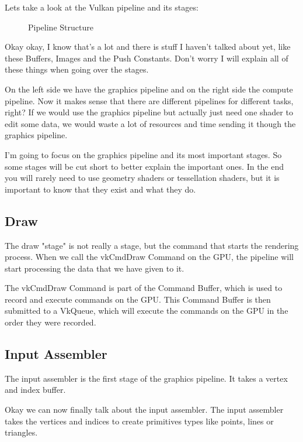 \documentclass[12pt]{report} \usepackage{preamble}
\begin{document}
Lets take a look at the Vulkan pipeline and its stages:

\begin{figure}[hbtp]
	\fontsize{6}{10}\selectfont
	\centering 
	\caption{Pipeline Structure \cite{fig:pipeline}}
\end{figure} \FloatBarrier

Okay okay, I know that's a lot and there is stuff I haven't talked about
yet, like these Buffers, Images and the Push Constants. Don't worry I
will explain all of these things when going over the stages.

On the left side we have the graphics pipeline and on the right side the
compute pipeline. Now it makes sense that there are different pipelines
for different tasks, right? If we would use the graphics pipeline but
actually just need one shader to edit some data, we would waste a lot
of resources and time sending it though the graphics pipeline.

I'm going to focus on the graphics pipeline and its most important stages.
So some stages will be cut short to better explain the important ones.
In the end you will rarely need to use geometry shaders or tessellation
shaders, but it is important to know that they exist and what they do.

\subsection{Draw}

The draw "stage" is not really a stage, but the command that starts
the rendering process. When we call the vkCmdDraw Command on the GPU,
the pipeline will start processing the data that we have given to
it. \cite{vulkan-spec-draw}

The vkCmdDraw Command is part of the Command Buffer, which is used to
record and execute commands on the GPU. This Command Buffer is then
submitted to a VkQueue, which will execute the commands on the GPU
in the order they were recorded. \cite{command-buffers}


\subsection{Input Assembler}

The input assembler is the first stage of the graphics pipeline. It takes
a vertex and index buffer. \cite{vulkan-spec-pipelines}

Okay we can now finally talk about the input assembler. The input
assembler takes the vertices and indices to create primitives types like
points, lines or triangles. \cite{microsoft-ia}
\end{document}
